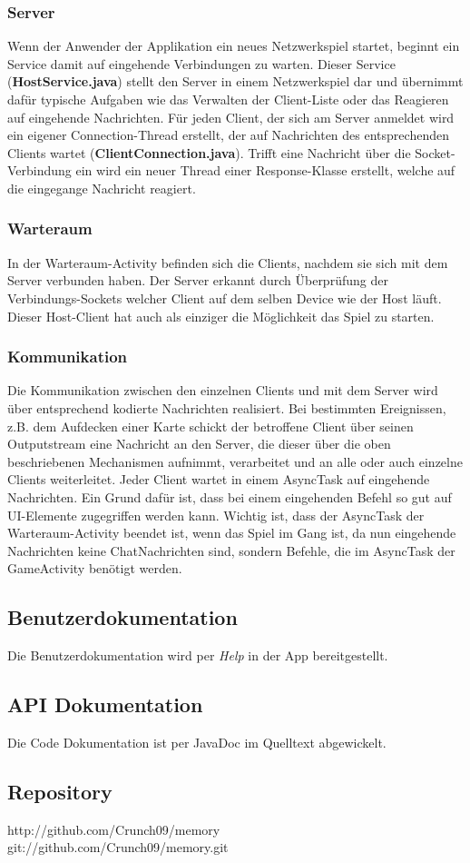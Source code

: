 \documentclass[11pt,a4paper]{article}
\begin{document}
\subsubsection{Server}
Wenn der Anwender der Applikation ein neues Netzwerkspiel startet, beginnt ein Service damit auf eingehende Verbindungen zu warten. Dieser Service (\textbf{HostService.java}) stellt den Server in einem Netzwerkspiel dar und übernimmt dafür typische Aufgaben wie das Verwalten der Client-Liste oder das Reagieren auf eingehende Nachrichten. Für jeden Client, der sich am Server anmeldet wird ein eigener Connection-Thread erstellt, der auf Nachrichten des entsprechenden Clients wartet (\textbf{ClientConnection.java}). Trifft eine Nachricht über die Socket-Verbindung ein wird ein neuer Thread einer Response-Klasse erstellt, welche auf die eingegange Nachricht reagiert.
\subsubsection{Warteraum}
In der Warteraum-Activity befinden sich die Clients, nachdem sie sich mit dem Server verbunden haben. Der Server erkannt durch Überprüfung der Verbindungs-Sockets welcher Client auf dem selben Device wie der Host läuft. Dieser Host-Client hat auch als einziger die Möglichkeit das Spiel zu starten.
\subsubsection{Kommunikation}
Die Kommunikation zwischen den einzelnen Clients und mit dem Server wird über entsprechend kodierte Nachrichten realisiert. Bei bestimmten Ereignissen, z.B. dem Aufdecken einer Karte schickt der betroffene Client über seinen Outputstream eine Nachricht an den Server, die dieser über die oben beschriebenen Mechanismen aufnimmt, verarbeitet und an alle oder auch einzelne Clients weiterleitet.
Jeder Client wartet in einem AsyncTask auf eingehende Nachrichten. Ein Grund dafür ist, dass bei einem eingehenden Befehl so gut auf UI-Elemente zugegriffen werden kann. Wichtig ist, dass der AsyncTask der Warteraum-Activity beendet ist, wenn das Spiel im Gang ist, da nun eingehende Nachrichten keine ChatNachrichten sind, sondern Befehle, die im AsyncTask der GameActivity benötigt werden. 

\subsection*{Benutzerdokumentation}

Die Benutzerdokumentation wird per {\em Help} in der App bereitgestellt. 

\subsection*{API Dokumentation}

Die Code Dokumentation ist per JavaDoc im Quelltext abgewickelt.

\subsection*{Repository}

http://github.com/Crunch09/memory \\
git://github.com/Crunch09/memory.git
\end{document}
